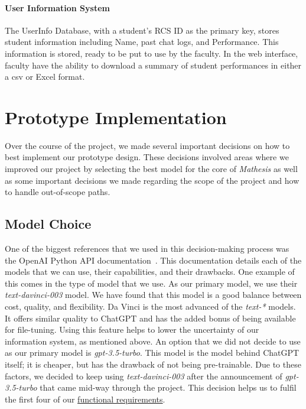 \documentclass[12pt,a4paper]{article}
\begin{document}
    \paragraph{User Information System}
    The UserInfo Database, with a student's RCS ID as the primary key, stores student information
    including Name, past chat logs, and Performance.  This information is stored, ready to be put to
    use by the faculty.  In the web interface, faculty have the ability to download a summary of
    student performances in either a csv or Excel format.


    \section{Prototype Implementation}

    Over the course of the project, we made several important decisions on how to best implement our
    prototype design.  These decisions involved areas where we improved our project by selecting
    the best model for the core of \textit{Mathesis} as well as some important decisions we made
    regarding the scope of the project and how to handle out-of-scope paths.

    \subsection{Model Choice}

    One of the biggest references that we used in this decision-making process was
    the OpenAI Python API documentation~\cite{openAiDocs}.  This documentation details
    each of the models that we can use, their capabilities, and their drawbacks.  One example of this
    comes in the type of model that we use.  As our primary model, we use their \textit{text-davinci-003}
    model.  We have found that this model is a good balance between cost, quality, and flexibility.
    Da Vinci is the most advanced of the \textit{text-*} models.  It offers similar quality to ChatGPT
    and has the added bonus of being available for file-tuning.  Using this feature helps to lower
    the uncertainty of our information system, as mentioned above.  An option that we did not decide to
    use as our primary model is \textit{gpt-3.5-turbo}.  This model is the model behind ChatGPT itself;
    it is cheaper, but has the drawback of not being pre-trainable.  Due to these factors, we
    decided to keep using \textit{text-davinci-003} after the announcement of \textit{gpt-3.5-turbo}
    that came mid-way through the project.  This decision helps us to fulfil the first four of our
    \hyperref[functionalReqs]{functional requirements}.
\end{document}
